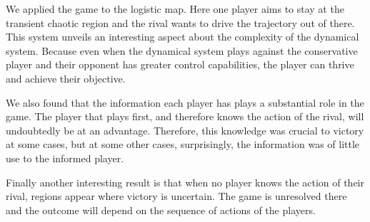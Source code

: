 We applied the game to the logistic map. Here one player aims to stay at the transient chaotic region and the rival wants to drive the trajectory out of there. This system unveils an interesting aspect about the complexity of the dynamical system. Because even when the dynamical system plays against the conservative player and their opponent has greater control capabilities, the player can thrive and achieve their objective.

We also found that the information each player has plays a substantial role in the game. The player that plays first, and therefore knows the action of the rival, will undoubtedly be at an advantage. Therefore, this knowledge was crucial to victory at some cases, but at some other cases, surprisingly, the information was of little use to the informed player.

Finally another interesting result is that when no player knows the action of their rival, regions appear where victory is uncertain. The game is unresolved there and the outcome will depend on the sequence of actions of the players.



